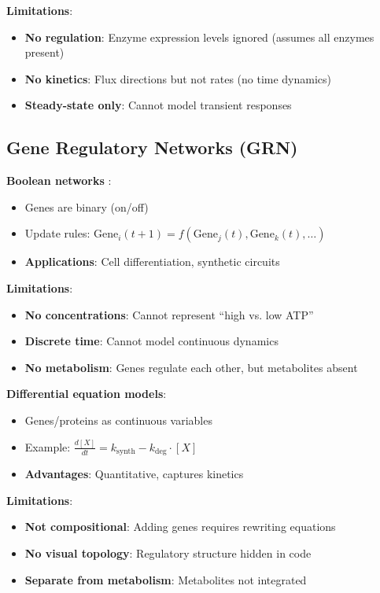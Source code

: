 \textbf{Limitations}:

\begin{itemize}
    \item \textbf{No regulation}: Enzyme expression levels ignored (assumes all enzymes present)
    \item \textbf{No kinetics}: Flux directions but not rates (no time dynamics)
    \item \textbf{Steady-state only}: Cannot model transient responses
\end{itemize}

\subsection{Gene Regulatory Networks (GRN)}
\label{subsec:grn}

\textbf{Boolean networks} \citep{Kauffman1969}:

\begin{itemize}
    \item Genes are binary (on/off)
    \item Update rules: $\text{Gene}_i(t+1) = f(\text{Gene}_j(t), \text{Gene}_k(t), \ldots)$
    \item \textbf{Applications}: Cell differentiation, synthetic circuits
\end{itemize}

\textbf{Limitations}:

\begin{itemize}
    \item \textbf{No concentrations}: Cannot represent ``high vs. low ATP''
    \item \textbf{Discrete time}: Cannot model continuous dynamics
    \item \textbf{No metabolism}: Genes regulate each other, but metabolites absent
\end{itemize}

\textbf{Differential equation models}:

\begin{itemize}
    \item Genes/proteins as continuous variables
    \item Example: $\frac{d[X]}{dt} = k_{\text{synth}} - k_{\text{deg}} \cdot [X]$
    \item \textbf{Advantages}: Quantitative, captures kinetics
\end{itemize}

\textbf{Limitations}:

\begin{itemize}
    \item \textbf{Not compositional}: Adding genes requires rewriting equations
    \item \textbf{No visual topology}: Regulatory structure hidden in code
    \item \textbf{Separate from metabolism}: Metabolites not integrated
\end{itemize}

